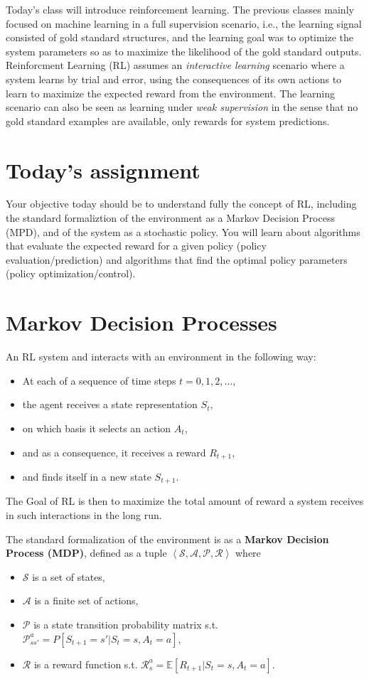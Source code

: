 Today's class will introduce reinforcement learning. The previous classes mainly focused on machine learning in a full supervision scenario, i.e., the learning signal consisted of gold standard structures, and the learning goal  was to optimize the system parameters so as to maximize the likelihood of the gold standard outputs. Reinforcment Learning (RL) assumes an \emph{interactive learning} scenario where a system learns by trial and error, using the consequences of its own actions to learn to maximize the expected reward from the environment. The learning scenario can also be seen as learning under \emph{weak supervision} in the sense that no gold standard examples are available, only rewards for system predictions.

\section{Today's assignment}

Your objective today should be to understand fully the concept of RL, including the standard formaliztion of the environment as a Markov Decision Process (MPD), and of the system as a stochastic policy. You will learn about algorithms that evaluate the expected reward for a given policy (policy evaluation/prediction) and algorithms that find the optimal policy parameters (policy optimization/control). 

\section{Markov Decision Processes}

An RL system and interacts with an environment in the following way:
  \begin{itemize}
  \item At each of a sequence of time steps $t = 0,1,2,\ldots$,
  \item the agent receives a state representation $S_t$,
  \item on which basis it selects an action $A_t$,
  \item and as a consequence, it receives a reward $R_{t+1}$,
  \item and finds itself in a new state $S_{t+1}$.
\end{itemize}

The Goal of RL is then to maximize the total amount of reward a system receives in such interactions in the long run. 

The standard formalization of the environment is as a \textbf{Markov Decision Process (MDP)}, defined as a tuple $\left< \mathcal{S}, \mathcal{A}, \mathcal{P}, \mathcal{R}
  \right>$ where
  \begin{itemize}
  \item $\mathcal{S}$ is a set of states,
  \item $\mathcal{A}$ is a finite set of actions,
  \item $\mathcal{P}$ is a state transition probability matrix s.t. $\mathcal{P}_{ss'}^{a} = P[S_{t+1} = s' | S_t = s, A_t = a]$, 
  \item $\mathcal{R}$ is a reward function  s.t. $\mathcal{R}_s^a = \mathbb{E}[R_{t+1}| S_t = s, A_t = a]$. 
  \end{itemize}

